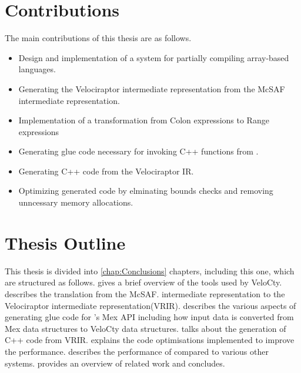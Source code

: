 \section{Contributions}
The main contributions of this thesis are as follows.
\begin{itemize}
\item Design and implementation of a system for partially compiling array-based languages. 
\item Generating the Velociraptor intermediate representation from the McSAF intermediate representation. 
\item Implementation of a transformation from  Colon expressions to Range expressions
\item Generating glue code necessary for invoking C++ functions from \matlab.
\item Generating C++ code from the Velociraptor IR.
\item Optimizing generated code by elminating bounds checks and removing unncessary memory allocations. 
\end{itemize}
\section{Thesis Outline}
This thesis is divided into \ref{chap:Conclusions} chapters, including this one, which are structured as follows.
 gives a brief overview of the tools
used by VeloCty.
 describes the translation from the McSAF.
intermediate representation to the Velociraptor intermediate representation(VRIR).
 describes the various aspects of generating glue code for \matlab's Mex API including how input data is converted from Mex data structures to VeloCty data structures. 
 talks about the generation of C++ code from VRIR.
 explains the code optimisations implemented to improve the performance. 
 describes the performance of \velocty compared to various other systems. 
 provides an overview of related work and
 concludes.
